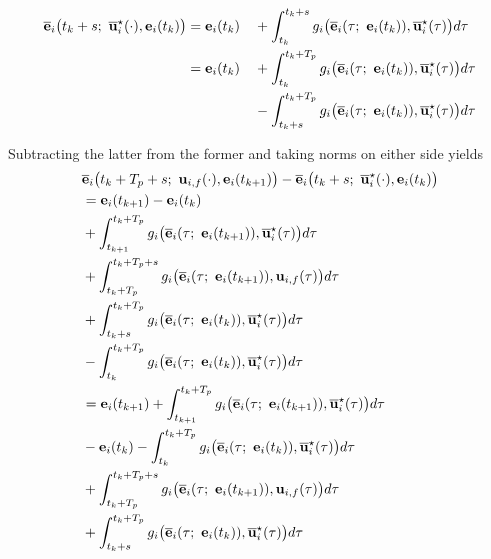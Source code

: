 \begin{bw_box}
\begin{alignat}{2}
    \overline{\vect{e}}_i\big(t_k + s;\ \overline{\vect{u}}_i^{\star}(\cdot), \vect{e}_i(t_k)\big)
      & = \vect{e}_i(t_k)
      && + \int_{t_k}^{t_k + s} g_i\big(\overline{\vect{e}}_i(\tau;\ \vect{e}_i(t_k)), \overline{\vect{u}}_i^{\star}(\tau)\big) d\tau \\
    & = \vect{e}_i(t_k)
        && + \int_{t_k}^{t_k + T_p} g_i\big(\overline{\vect{e}}_i(\tau;\ \vect{e}_i(t_k)), \overline{\vect{u}}_i^{\star}(\tau)\big) d\tau \\
      &  && - \int_{t_k + s}^{t_k + T_p} g_i\big(\overline{\vect{e}}_i(\tau;\ \vect{e}_i(t_k)), \overline{\vect{u}}_i^{\star}(\tau)\big) d\tau
  \end{alignat}



  Subtracting the latter from the former and taking norms on either side yields
  \begin{alignat}{2}
    &\overline{\vect{e}}_i\big(t_k + T_p + s;\ \vect{u}_{i,f}(\cdot), \vect{e}_i(t_{k+1})\big)
      -\overline{\vect{e}}_i\big(t_k + s;\ \overline{\vect{u}}_i^{\star}(\cdot), \vect{e}_i(t_k)\big) \\
    &= \vect{e}_i(t_{k+1}) - \vect{e}_i(t_k) \\
    &+ \int_{t_{k+1}}^{t_k + T_p} g_i\big(\overline{\vect{e}}_i(\tau;\ \vect{e}_i(t_{k+1})), \overline{\vect{u}}_i^{\star}(\tau)\big) d\tau \\
    &+ \int_{t_k + T_p}^{t_k + T_p + s} g_i\big(\overline{\vect{e}}_i(\tau;\ \vect{e}_i(t_{k+1})), \vect{u}_{i,f}(\tau)\big) d\tau \\
    &+ \int_{t_k + s}^{t_k + T_p} g_i\big(\overline{\vect{e}}_i(\tau;\ \vect{e}_i(t_k)), \overline{\vect{u}}_i^{\star}(\tau)\big) d\tau \\
    &- \int_{t_k}^{t_k + T_p} g_i\big(\overline{\vect{e}}_i(\tau;\ \vect{e}_i(t_k)), \overline{\vect{u}}_i^{\star}(\tau)\big) d\tau \\
    &= \vect{e}_i(t_{k+1})+ \int_{t_{k+1}}^{t_k + T_p} g_i\big(\overline{\vect{e}}_i(\tau;\ \vect{e}_i(t_{k+1})), \overline{\vect{u}}_i^{\star}(\tau)\big) d\tau \\
    &- \vect{e}_i(t_k) - \int_{t_k}^{t_k + T_p} g_i\big(\overline{\vect{e}}_i(\tau;\ \vect{e}_i(t_k)), \overline{\vect{u}}_i^{\star}(\tau)\big) d\tau\\
    &+ \int_{t_k + T_p}^{t_k + T_p + s} g_i\big(\overline{\vect{e}}_i(\tau;\ \vect{e}_i(t_{k+1})), \vect{u}_{i,f}(\tau)\big) d\tau \\
    &+ \int_{t_k + s}^{t_k + T_p} g_i\big(\overline{\vect{e}}_i(\tau;\ \vect{e}_i(t_k)), \overline{\vect{u}}_i^{\star}(\tau)\big) d\tau \\

\end{alignat}
\end{bw_box}
